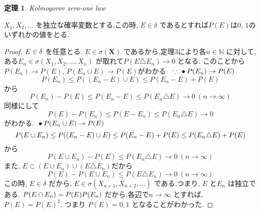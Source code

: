 \documentclass{jsarticle}
\newtheorem{thm}{定理}
\begin{document}
\begin{thm}
Kolmogorov zero-one law
\end{thm}

$X_{1},X_{2}, \dots$ を独立な確率変数とする.この時, $E\in\delta$ であるとすれば$P(E)$は$0$, $1$のいずれかの値をとる.

\begin{proof}
$\\  E \in \delta$ を任意とる. $E \in \sigma (\textbf {X})$ であるから,定理3により各$n \in \mathbb{N}$ に対して,
ある$E_{n} \in \sigma (X_{1}, X_{2}, \dots , X_{n})$ が取れて$P(E \triangle E_{n}) \to 0$ となる.
このことから$P(E_{n}) \to P(E), \, P(E_{n} \cup E) \to P(E)$がわかる.
$\\ \because $ 
$\\ \bullet P(E_{n}) \to P(E)\\$ $$
P(E_{n}) \le P((E_{n}-E) \cup E ) \le P(E_{n}-E) + P(E)$$から$$P(E_{n})-P(E) \le P(E_{n}-E) \le P(E_{n} \triangle E) \to 0 \ (n \to \infty)$$ 同様にして 
$$P(E)-P(E_{n}) \le P(E-E_{n}) \le P(E_{n} \triangle E) \to 0$$がわかる. 
$\\ \bullet P(E_{n} \cup E) \to P(E)$
$$\\ P(E \cup E_{n}) \le P((E_{n}-E) \cup E) \le P(E_{n}-E) + P(E) \le P(E_{n} \triangle E) + P(E)$$から
$$P(E \cup E_{n})-P(E) \le P(E_{n} \triangle E) \to 0 \ (n \to \infty)$$
また, $E \subset (E \cup E_{n}) \cup (E \triangle E_{n})$だから$$P(E)-P(E \cup E_{n}) \le P(E \triangle E_{n}) \to 0 \ (n \to \infty)$$
この時, $E \in \delta$ だから, $E \in \sigma (X_{n+1}, X_{n+2}, \dots)$ である.つまり, $E$ と$E_{n}$ は独立である.
$\displaystyle \\ P(E \cap E_{n} ) = P(E)P( E_{n} )$ だから,各辺で$n \to \infty$ とすれば, $P(E) = P(E)^{2}$. つまり $P(E)=0,1$ となることがわかった.

\end{proof}
\end{document}
